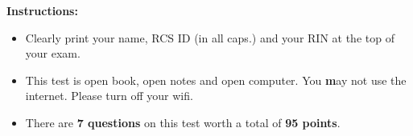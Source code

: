 \documentclass[10pt]{article}
\begin{document}
\vspace*{.45in} 

{\large\bf Instructions:}
\begin{itemize}
\item Clearly print your name, RCS ID (in all caps.) and your RIN at the top of your exam.
\item This test is open book, open notes and open computer. You {\textbf may not} use the internet. Please turn off your wifi.
\item There are \textbf{7 questions} on this test worth a total of
  \textbf{95 points}.
\end{itemize}


\newpage

\fi
\end{document}
